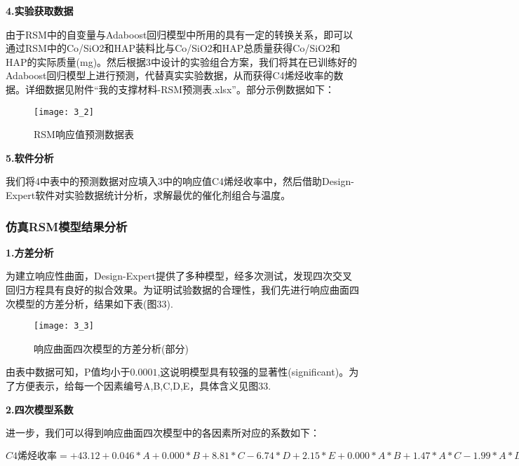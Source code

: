 \documentclass[withoutpreface,bwprint]{cumcmthesis} %
\begin{document}
\textbf{4.实验获取数据}

由于RSM中的自变量与Adaboost回归模型中所用的具有一定的转换关系，即可以通过RSM中的Co/SiO2和HAP装料比与Co/SiO2和HAP总质量获得Co/SiO2和HAP的实际质量(mg)。然后根据3中设计的实验组合方案，我们将其在已训练好的Adaboost回归模型上进行预测，代替真实实验数据，从而获得C4烯烃收率的数据。详细数据见附件“我的支撑材料-RSM预测表.xlsx”。部分示例数据如下：
\begin{figure}[!h]
	\centering
	\texttt{[image: 3\_2]}
	\caption{RSM响应值预测数据表}
	\label{fig:circuit-diagram1}
\end{figure}

\textbf{5.软件分析}

我们将4中表中的预测数据对应填入3中的响应值C4烯烃收率中，然后借助Design-Expert软件对实验数据统计分析，求解最优的催化剂组合与温度。


\subsubsection{仿真RSM模型结果分析}
\textbf{1.方差分析}

为建立响应性曲面，Design-Expert提供了多种模型，经多次测试，发现四次交叉回归方程具有良好的拟合效果。为证明试验数据的合理性，我们先进行响应曲面四次模型的方差分析，结果如下表(图33).
\begin{figure}[!h]
	\centering
	\texttt{[image: 3\_3]}
	\caption{响应曲面四次模型的方差分析(部分)}
	\label{fig:circuit-diagram1}
\end{figure}
由表中数据可知，P值均小于$0.0001$,这说明模型具有较强的显著性(significant)。为了方便表示，给每一个因素编号A,B,C,D,E，具体含义见图33.


\textbf{2.四次模型系数}

进一步，我们可以得到响应曲面四次模型中的各因素所对应的系数如下：

$C4\text{烯烃收率}	 =
+43.12
+0.046	 * A
+0.000	 * B
+8.81	 * C
-6.74	 * D
+2.15	 * E
+0.000	 * A * B
+1.47	 * A * C
-1.99	 * A * D
-2.75	 * A * E
+0.000	 * B * C
+0.000	 * B * D
+0.000	 * B * E
-0.11	 * C * D
-8.81	 * C * E
+6.74	 * D * E
-10.05	 * A^2
+6.87	 * B^2
-1.95	 * C^2
-4.46	 * D^2
-6.87	 * E^2
+0.000	 * A^2 * B
-7.35	 * A^2 * C
+2.53	 * A^2 * D
-1.99	 * A^2 * E
+8.01	 * A * B^2
+3.60	 * A * C^2
+1.70	 * A * D^2
-8.81	 * B^2 * C
+0.44	 * B^2 * D
-2.15	 * B^2 * E
+0.000	 * B * C^2
+0.000	 * B * D^2
+0.33	 * C^2 * D
+6.67	 * C^2 * E
-8.93	 * C * D^2
-5.38	 * A^2 * B^2
-0.98	 * A^2 * C^2
-8.742E-003	 * A^2 * D^2
-4.92	 * B^2 * C^2
-8.70	 * B^2 * D^2
$
\end{document}
